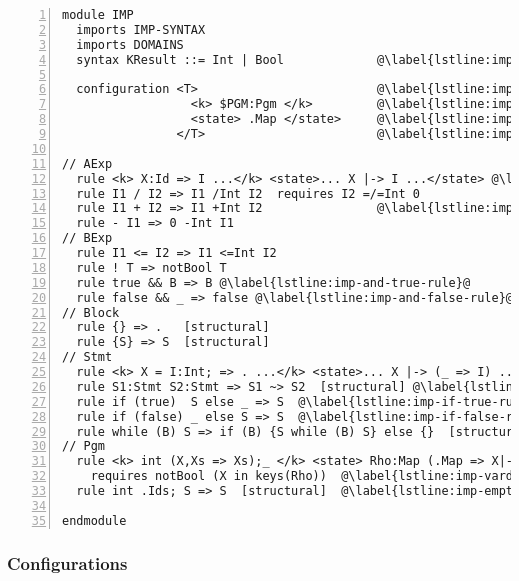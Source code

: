 \begin{lstlisting}[float=t,
  frame=single,
  style=ksty,
  language=k,
  numbers=left,
  numbersep=5pt,
  caption={$\K$ Semantics of Imp},
  label={lst:imp-semantics},
  xleftmargin=3ex
]
module IMP
  imports IMP-SYNTAX
  imports DOMAINS
  syntax KResult ::= Int | Bool             @\label{lstline:imp-kresult}@

  configuration <T>                         @\label{lstline:imp-config-start}@
                  <k> $PGM:Pgm </k>         @\label{lstline:imp-pgm-var}@
                  <state> .Map </state>     @\label{lstline:imp-pgm-state}@
                </T>                        @\label{lstline:imp-config-end}@

// AExp
  rule <k> X:Id => I ...</k> <state>... X |-> I ...</state> @\label{lstline:imp-lookup-rule}@
  rule I1 / I2 => I1 /Int I2  requires I2 =/=Int 0
  rule I1 + I2 => I1 +Int I2                @\label{lstline:imp-add-rule}@
  rule - I1 => 0 -Int I1
// BExp
  rule I1 <= I2 => I1 <=Int I2
  rule ! T => notBool T
  rule true && B => B @\label{lstline:imp-and-true-rule}@
  rule false && _ => false @\label{lstline:imp-and-false-rule}@
// Block
  rule {} => .   [structural]
  rule {S} => S  [structural]
// Stmt
  rule <k> X = I:Int; => . ...</k> <state>... X |-> (_ => I) ...</state> @\label{lstline:imp-assgn-rule}@
  rule S1:Stmt S2:Stmt => S1 ~> S2  [structural] @\label{lstline:imp-stmt-decomp-rule}@
  rule if (true)  S else _ => S  @\label{lstline:imp-if-true-rule}@
  rule if (false) _ else S => S  @\label{lstline:imp-if-false-rule}@
  rule while (B) S => if (B) {S while (B) S} else {}  [structural]
// Pgm
  rule <k> int (X,Xs => Xs);_ </k> <state> Rho:Map (.Map => X|->0) </state> @\label{lstline:imp-vardec-rule}@
    requires notBool (X in keys(Rho))  @\label{lstline:imp-vardec-requires}@
  rule int .Ids; S => S  [structural]  @\label{lstline:imp-emptydec-rule}@

endmodule
\end{lstlisting}

\subsubsection{Configurations}\label{sec:k-configuration}

